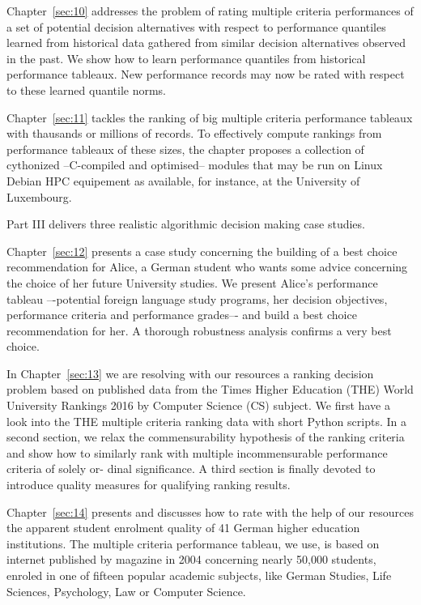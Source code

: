 Chapter~\vref{sec:10} addresses the problem of rating multiple criteria performances of a set of potential decision alternatives with respect to performance quantiles learned from historical data gathered from similar decision alternatives observed in the past. We show how to learn performance quantiles from historical performance tableaux. New performance records may now be rated with respect to these learned quantile norms.

Chapter~\vref{sec:11} tackles the ranking of big multiple criteria performance tableaux with thausands or millions of records. To effectively compute rankings from performance tableaux of these sizes, the chapter proposes a collection of cythonized --C-compiled and optimised-- modules that may be run on Linux Debian HPC equipement as available, for instance, at the University of Luxembourg.

Part III delivers three realistic algorithmic decision making case studies.

Chapter~\vref{sec:12} presents a case study concerning the building of a best choice recommendation for Alice, a German student who wants some advice concerning the choice of her future University studies. We present Alice’s performance tableau –-potential foreign language study programs, her decision objectives, performance criteria and performance grades–- and build a best choice recommendation for her. A thorough robustness analysis confirms a very best choice.

In Chapter~\vref{sec:13} we are resolving with our \Digraph resources a ranking decision problem based on published data from the Times Higher Education (THE) World University Rankings 2016 by Computer Science (CS) subject. We first have a look into the THE multiple criteria ranking data with short Python scripts. In a second section, we relax the commensurability hypothesis of the ranking criteria and show how to similarly rank with multiple incommensurable performance criteria of solely or- dinal significance. A third section is finally devoted to introduce quality measures for qualifying ranking results.

Chapter~\vref{sec:14} presents and discusses how to rate with the help of our \Digraph resources the apparent student enrolment quality of 41 German higher education institutions. The multiple criteria performance tableau, we use, is based on internet published by \Spiegel magazine in 2004 concerning nearly 50,000 students, enroled in one of fifteen popular academic subjects, like German Studies, Life Sciences, Psychology, Law or Computer Science.

